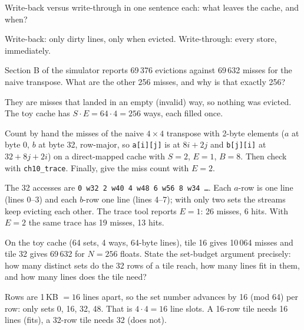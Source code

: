 \begin{exercise}[easy]
Write-back versus write-through in one sentence each: what leaves the
cache, and when?
\end{exercise}
\begin{solution}[hint]
Write-back: only dirty lines, only when evicted. Write-through: every
store, immediately.
\end{solution}

\begin{exercise}[easy]
Section B of the simulator reports 69\,376 evictions against 69\,632
misses for the naive transpose. What are the other 256 misses, and why
is that exactly 256?
\end{exercise}
\begin{solution}[hint]
They are misses that landed in an empty (invalid) way, so nothing was
evicted. The toy cache has $S\cdot E=64\cdot4=256$ ways, each filled
once.
\end{solution}

\begin{exercise}[medium]
Count by hand the misses of the naive $4\times4$ transpose with
2-byte elements ($a$ at byte 0, $b$ at byte 32, row-major, so
\texttt{a[i][j]} is at $8i+2j$ and \texttt{b[j][i]} at $32+8j+2i$) on a
direct-mapped cache with $S{=}2$, $E{=}1$, $B{=}8$. Then check with
\texttt{ch10\_trace}. Finally, give the miss count with $E{=}2$.
\end{exercise}
\begin{solution}[hint]
The 32 accesses are \texttt{0 w32 2 w40 4 w48 6 w56 8 w34 \ldots}. Each
$a$-row is one line (lines 0--3) and each $b$-row one line (lines 4--7);
with only two sets the streams keep evicting each other. The trace
tool reports $E{=}1$: 26 misses, 6 hits. With $E{=}2$ the same trace has
19 misses, 13 hits.
\end{solution}

\begin{exercise}[medium]
On the toy cache (64 sets, 4 ways, 64-byte lines), tile 16 gives 10\,064
misses and tile 32 gives 69\,632 for $N{=}256$ floats. State the
set-budget argument precisely: how many distinct sets do the 32 rows of
a tile reach, how many lines fit in them, and how many lines does the
tile need?
\end{exercise}
\begin{solution}[hint]
Rows are 1\,KB $=16$ lines apart, so the set number advances by 16 (mod
64) per row: only sets 0, 16, 32, 48. That is $4\cdot4=16$ line slots.
A 16-row tile needs 16 lines (fits), a 32-row tile needs 32 (does not).
\end{solution}

